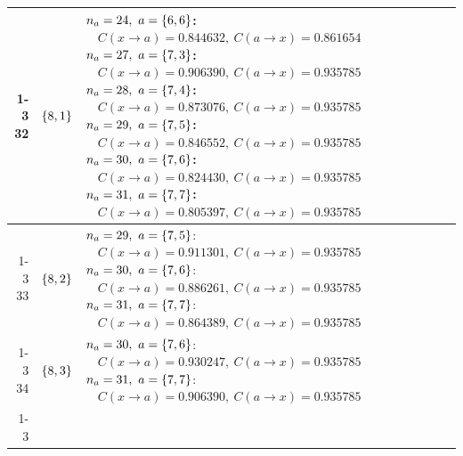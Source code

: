 \begin{longtable}{@{}r l >{\raggedright\arraybackslash}p{}@{}}
  \cmidrule(lr){1-3}
  32 & \(\left\{8,1\right\}\) & \(n_a=24,\ a=\sig{6,6}\):\newline \(\quad C(x\!\to\!a)=0.844632,\ C(a\!\to\!x)=0.861654\)\newline \(n_a=27,\ a=\sig{7,3}\):\newline \(\quad C(x\!\to\!a)=0.906390,\ C(a\!\to\!x)=0.935785\)\newline \(n_a=28,\ a=\sig{7,4}\):\newline \(\quad C(x\!\to\!a)=0.873076,\ C(a\!\to\!x)=0.935785\)\newline \(n_a=29,\ a=\sig{7,5}\):\newline \(\quad C(x\!\to\!a)=0.846552,\ C(a\!\to\!x)=0.935785\)\newline \(n_a=30,\ a=\sig{7,6}\):\newline \(\quad C(x\!\to\!a)=0.824430,\ C(a\!\to\!x)=0.935785\)\newline \(n_a=31,\ a=\sig{7,7}\):\newline \(\quad C(x\!\to\!a)=0.805397,\ C(a\!\to\!x)=0.935785\) \\
  \cmidrule(lr){1-3}
  33 & \(\left\{8,2\right\}\) & \(n_a=29,\ a=\sig{7,5}\):\newline \(\quad C(x\!\to\!a)=0.911301,\ C(a\!\to\!x)=0.935785\)\newline \(n_a=30,\ a=\sig{7,6}\):\newline \(\quad C(x\!\to\!a)=0.886261,\ C(a\!\to\!x)=0.935785\)\newline \(n_a=31,\ a=\sig{7,7}\):\newline \(\quad C(x\!\to\!a)=0.864389,\ C(a\!\to\!x)=0.935785\) \\
  \cmidrule(lr){1-3}
  34 & \(\left\{8,3\right\}\) & \(n_a=30,\ a=\sig{7,6}\):\newline \(\quad C(x\!\to\!a)=0.930247,\ C(a\!\to\!x)=0.935785\)\newline \(n_a=31,\ a=\sig{7,7}\):\newline \(\quad C(x\!\to\!a)=0.906390,\ C(a\!\to\!x)=0.935785\) \\
  \cmidrule(lr){1-3}

\end{longtable}
